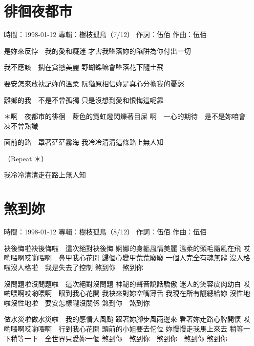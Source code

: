 \documentclass[UTF8,a4paper,oneside,twocolumn,12pt]{ctexbook}
\newcommand{\infopair}[2]{\textbullet #1：#2}
\newcommand{\zc}[1][伍佰]{\infopair{作詞}{#1}}
\newcommand{\zq}[1][伍佰]{\infopair{作曲}{#1}}
\newcommand{\zj}[1]{\infopair{專輯}{#1}}
\newcommand{\sj}[1]{\infopair{時間}{#1}}
\newenvironment{info}{\begin{flushleft}\kaishu
	}
	{\end{flushleft}\normalsize\yahei\par}
\newenvironment{lyric}{
	}
{}
\begin{document}
\section{徘徊夜都市}
\begin{info}
	\sj{1998-01-12}
	\zj{樹枝孤鳥（7/12）}
	\zc
	\zq
\end{info}
\begin{lyric}
	是妳來反悖　我的愛和癡迷
	才害我墜落妳的陷阱為你付出一切

	我不應該　擱在貪戀美麗
	野蝴蝶嘛會墜落花下隨土飛

	要安怎來放袂記妳的溫柔
	阮猶原相信妳是真心分擔我的憂愁

	離鄉的我　不是不曾孤獨
	只是沒想到愛和恨悔這呢靠

	＊啊　夜都市的徘徊　藍色的霓虹燈閃爍著目屎
	啊　一心的期待　是不是妳咱會凍不曾熟識

	面前的路　罩著茫茫霧海
	我冷冷清清這條路上無人知

	（Repeat ＊）

	我冷冷清清走在路上無人知
\end{lyric}

\section{煞到妳}
\begin{info}
	\sj{1998-01-12}
	\zj{樹枝孤鳥（8/12）}
	\zc
	\zq
\end{info}
\begin{lyric}
	袂後悔啦袂後悔啦　這次絕對袂後悔
	婀娜的身軀風情美麗
	溫柔的頭毛隨風在飛
	哎喲喂啊哎喲喂啊　鼻甲我心花開
	歸個心變甲荒荒廢廢
	一個人完全有魂無體
	沒人格啦沒人格啦　我是失去了控制
	煞到你　煞到你

	沒問題啦沒問題啦　這次絕對沒問題
	神祕的聲音說話驕傲
	迷人的笑容皮肉幼白
	哎喲喂啊哎喲喂啊　眼到我心花開
	我袂來對妳空嘴薄舌
	我現在所有隴總給妳
	沒性地啦沒性地啦　要安怎樣隴沒關係
	煞到你　煞到你

	做水災啦做水災啦　我的感情大風颱
	跟著妳腳步風雨邊來
	看著妳走路心脾開懷
	哎喲喂啊哎喲喂啊　行到我心花開
	頭前的小姐要去佗位
	妳慢慢走我馬上來去
	稍等一下稍等一下　全世界只愛妳一個
	煞到你　煞到你　煞到你　煞到你
	煞到你
\end{lyric}
\end{document}

